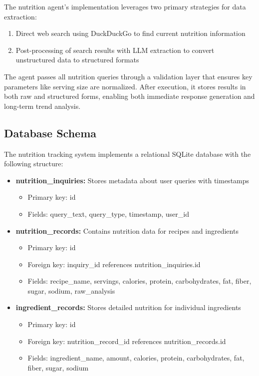\documentclass{ecai}
\begin{document}
The nutrition agent's implementation leverages two primary strategies for data extraction:
\begin{enumerate}[noitemsep,topsep=0pt]
    \item Direct web search using DuckDuckGo to find current nutrition information
    \item Post-processing of search results with LLM extraction to convert unstructured data to structured formats
\end{enumerate}

The agent passes all nutrition queries through a validation layer that ensures key parameters like serving size are normalized. After execution, it stores results in both raw and structured forms, enabling both immediate response generation and long-term trend analysis.

\subsection{Database Schema}

The nutrition tracking system implements a relational SQLite database with the following structure:

\begin{itemize}[noitemsep,topsep=0pt]
    \item \textbf{nutrition\_inquiries:} Stores metadata about user queries with timestamps
    \begin{itemize}[noitemsep,topsep=0pt]
        \item Primary key: id
        \item Fields: query\_text, query\_type, timestamp, user\_id
    \end{itemize}
    \item \textbf{nutrition\_records:} Contains nutrition data for recipes and ingredients
    \begin{itemize}[noitemsep,topsep=0pt]
        \item Primary key: id
        \item Foreign key: inquiry\_id references nutrition\_inquiries.id
        \item Fields: recipe\_name, servings, calories, protein, carbohydrates, fat, fiber, sugar, sodium, raw\_analysis
    \end{itemize}
    \item \textbf{ingredient\_records:} Stores detailed nutrition for individual ingredients
    \begin{itemize}[noitemsep,topsep=0pt]
        \item Primary key: id
        \item Foreign key: nutrition\_record\_id references nutrition\_records.id
        \item Fields: ingredient\_name, amount, calories, protein, carbohydrates, fat, fiber, sugar, sodium
    \end{itemize}
\end{itemize}
\end{document}
